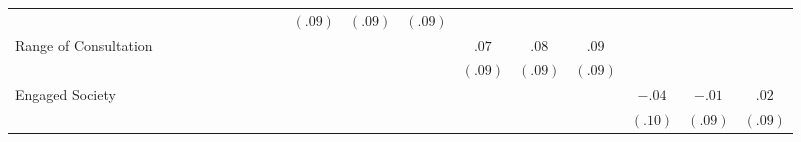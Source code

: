 \begin{landscape}
\begin{table}[!htb]
{\begin{tabular}{l c c c c c c c c c c c c c c c c c c }
			&                            &                            &                       &                            &                            &                       &                           &                            &                       & $(.09)$                    & $(.09)$                   & $(.09)$                    &                           &                            &                            &                            &                            &                       \\
			\quad Range of Consultation                 &                            &                            &                       &                            &                            &                       &                           &                            &                       &                            &                           &                            & $.07$                     & $.08$                      & $.09$                      &                            &                            &                       \\
			&                            &                            &                       &                            &                            &                       &                           &                            &                       &                            &                           &                            & $(.09)$                   & $(.09)$                    & $(.09)$                    &                            &                            &                       \\
			\quad Engaged Society                       &                            &                            &                       &                            &                            &                       &                           &                            &                       &                            &                           &                            &                           &                            &                            & $-.04$                     & $-.01$                     & $.02$                 \\
			&                            &                            &                       &                            &                            &                       &                           &                            &                       &                            &                           &                            &                           &                            &                            & $(.10)$                    & $(.09)$                    & $(.09)$               \\

\end{tabular}}
\end{table}
\end{landscape}
